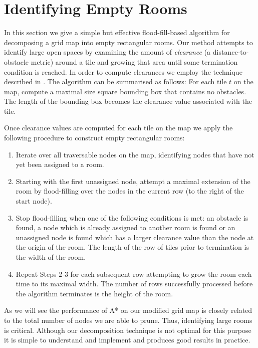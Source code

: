 \section{Identifying Empty Rooms}
\label{empty rooms}
In this section we give a simple but effective flood-fill-based algorithm for decomposing a 
grid map into empty rectangular rooms.
Our method attempts to identify large open spaces by examining the amount of \emph{clearance}
(a distance-to-obstacle metric) around a tile and growing that area until some termination 
condition is reached.
In order to compute clearances we employ the technique described in \cite{harabor08}.
The algorithm can be summarised as follows:
For each tile $t$ on the map, compute a maximal size square bounding box that contains no obstacles.
The length of the bounding box becomes the clearance value associated with the tile.
%
\par
Once clearance values are computed for each tile on the map we apply the following
procedure to construct empty rectangular rooms:


\begin{enumerate}
\item{Iterate over all traversable nodes on the map, identifying nodes that have not yet 
been assigned to a room.}
\item{Starting with the first unassigned node, attempt a maximal extension of the room
by flood-filling over the nodes in the current row (to the right of the start node).}
\item{Stop flood-filling when one of the following conditions is met: an obstacle is found,
a node which is already assigned to another room is found or an unassigned
node is found which has a larger clearance value than the node at the origin of the room.
The length of the row of tiles prior to termination is the width of the room.}
\item{Repeat Steps 2-3 for each subsequent row attempting to grow the room
each time to its maximal width.
The number of rows successfully processed before the algorithm terminates is the height of the room.}
\end{enumerate}


As we will see the performance of A* on our modified grid map is closely related to the total 
number of nodes we are able to prune.
Thus, identifying large rooms is critical.
Although our decomposition technique is not optimal for this purpose it is simple
to understand and implement and produces good results in practice.
